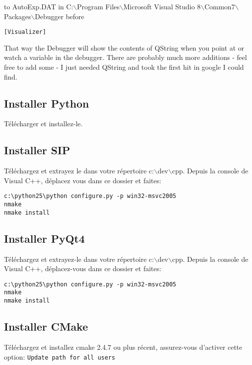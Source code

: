 to AutoExp.DAT in C:$\backslash$Program Files$\backslash$Microsoft Visual Studio
8$\backslash$Common7$\backslash$Packages$\backslash$Debugger before 

\begin{verbatim}
[Visualizer]
\end{verbatim}

That way the Debugger will show the contents of QString when you point at or
watch a variable in the debugger.  There are probably much more additions -
feel free to add some - I just needed QString and took the first hit in google
I could find.

\subsection{Installer Python}
Télécharger  et installez-le.

\subsection{Installer SIP}
Téléchargez et extrayez le dans votre répertoire c:$\backslash$dev$\backslash$cpp.
Depuis la console de Visual C++, déplacez vous dans ce dossier et faites:

\begin{verbatim}
c:\python25\python configure.py -p win32-msvc2005
nmake
nmake install
\end{verbatim}

\subsection{Installer PyQt4}
Téléchargez  et extrayez-le dans votre répertoire c:$\backslash$dev$\backslash$cpp.
Depuis la console de Visual C++, déplacez-vous dans ce dossier et faites:

\begin{verbatim}
c:\python25\python configure.py -p win32-msvc2005
nmake
nmake install
\end{verbatim}

\subsection{Installer CMake}
Téléchargez et installez cmake 2.4.7 ou plus récent, assurez-vous d'activer cette option:
\texttt{Update path for all users}

